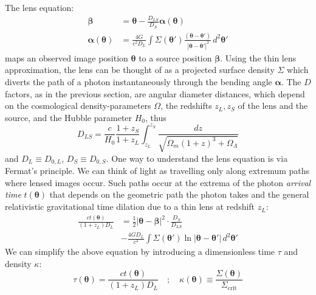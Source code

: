 \documentclass[galley,usenatbib]{mn2e}
\renewcommand{\vec}[1]{\ensuremath{\boldsymbol{#1}}}
\begin{document}
The lens equation:
%
\begin{equation}
\begin{aligned}
    \vec\beta &= \vec\theta - \frac{D_{LS}}{D_S}\vec\alpha(\vec\theta) \\
\vec\alpha(\vec\theta) &= \frac{4G}{c^2D_L} \int \Sigma(\vec\theta')
                          \frac{(\vec\theta - \vec\theta')}
                          {\ |\vec\theta - \vec\theta'|^2} \, d^2\vec\theta'
\end{aligned}
\label{eqn:lens_equation}
\end{equation}
%
maps an observed image position $\vec\theta$ to a source position
$\vec\beta$.  Using the thin lens approximation, the lens can be thought of as
a projected surface density $\Sigma$ which diverts the path of a photon
instantaneously through the bending angle $\vec\alpha$.  The $D$ factors, as in
the previous section, are angular diameter distances, which depend on the
cosmological density-parameters $\Omega$, the redshifts $z_L,z_S$ of the lens
and the source, and the Hubble parameter $H_0$, thus
%
\begin{equation}
D_{LS} = \frac c{H_0} \frac{1+z_S}{1+z_L} \int_{z_L}^{z_S}
                      \frac{dz}{\sqrt{\Omega_m(1+z)^3 + \Omega_\Lambda}}
\end{equation}
%
and $D_L \equiv D_{0,L}$, $D_S \equiv D_{0,S}$.  One way to understand the lens
equation is via Fermat's principle. We can think of light as travelling only
along extremum paths where lensed images occur.  Such paths occur at the
extrema of the photon {\it arrival time} $t(\vec\theta)$ that depends on the
geometric path the photon takes and the general relativistic gravitational time
dilation due to a thin lens at redshift $z_L$:
%
\begin{equation}
\begin{aligned}
\frac{ct(\vec\theta)}{(1+z_L)D_{L}}
&= {\textstyle\frac12} |\vec\theta - \vec\beta|^2
   \cdot \frac{D_{S}}{D_{LS}} \\
&- \frac{4GD_L}{c^2}
   \int \Sigma(\vec\theta') \ln |\vec\theta-\vec\theta'| \, d^2\vec\theta'
\label{full arrival time}
\end{aligned}
\end{equation}
%
We can simplify the above equation by introducing a dimensionless time $\tau$
and density $\kappa$: 
%
\begin{equation}
\tau(\vec\theta) = \frac{ct(\vec\theta)}{(1+z_L)D_{L}} \quad ; \quad 
\kappa(\vec\theta) \equiv \frac{\Sigma(\vec\theta)}{\Sigma_\mathrm{crit}}
\end{equation}
\end{document}
